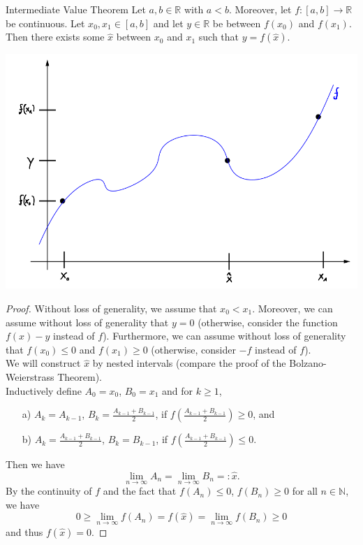 

\begin{Theorem}{Intermediate Value Theorem}
Let $a,b\in\mathbb{R}$ with $a<b$. Moreover, let $f:[a,b]\to\mathbb{R}$ be continuous. Let $x_0,x_1\in [a,b]$ and let $y\in\mathbb{R}$ be between $f(x_0)$ and $f(x_1)$. Then there exists some $\hat{x}$ between $x_0$ and $x_1$ such that $y=f(\hat{x})$.
\end{Theorem}

\includegraphics{./imvt.png}


\begin{proof}
Without loss of generality, we assume that $x_0<x_1$. Moreover, we can assume without loss of generality that $y=0$ (otherwise, consider the function $f(x)-y$ instead of $f$). Furthermore,
we can assume without loss of generality that $f(x_0)\leq0$ and $f(x_1)\geq0$ (otherwise, consider $-f$ instead of $f$).\\
We will construct $\hat{x}$ by nested intervals (compare the proof of the Bolzano-Weierstrass Theorem).\\
Inductively define $A_0=x_0$, $B_0=x_1$ and for $k\geq1$,
\begin{itemize}
 \item[a)] $A_k=A_{k-1}$, $B_k=\frac{A_{k-1}+B_{k-1}}2$, if $f(\frac{A_{k-1}+B_{k-1}}2)\geq0$, and
 \item[b)] $A_k=\frac{A_{k-1}+B_{k-1}}2$, $B_k=B_{k-1}$, if $f(\frac{A_{k-1}+B_{k-1}}2)\leq0$.
\end{itemize}
Then we have
\[\lim_{n\to\infty}A_n=\lim_{n\to\infty}B_n=:\hat{x}.\]
By the continuity of $f$ and the fact that $f(A_n)\leq0$, $f(B_n)\geq0$ for all $n\in\mathbb{N}$, we have
\[0\geq\lim_{n\to\infty}f(A_n)=f(\hat{x})=\lim_{n\to\infty}f(B_n)\geq0\]
and thus $f(\hat{x})=0$.
\end{proof}

